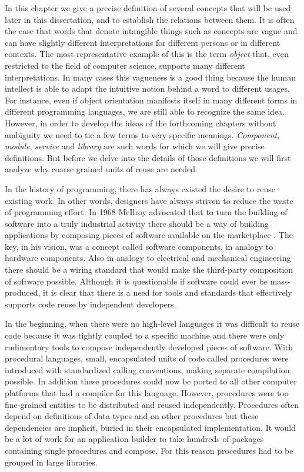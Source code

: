 In this chapter we give a precise definition of several concepts that will be used later in this dissertation, and to
establish the relations between them. It is often the case that words that denote intangible things such as concepts are vague
and can have slightly different interpretations for different persons or in different contexts. The most representative example
of this is the term \emph{object} that, even restricted to the field of computer science, supports many different interpretations.
In many cases this vagueness is a good thing because the human intellect is able to adapt the intuitive notion behind a word
to different usages. For instance, even if object orientation manifests itself in many different forms in different programming
languages, we are still able to recognize the same idea. However, in order to develop the ideas of the forthcoming chapters
without ambiguity we need to tie a few terms to very specific meanings. \emph{Component}, \emph{module}, \emph{service} and
\emph{library} are such words for which we will give precise definitions. But before we delve into the details of those
definitions we will first analyze why coarse grained units of reuse are needed.

In the history of programming, there has always existed the desire to reuse existing work. In other words, designers have always
striven to reduce the waste of programming effort. In 1968 McIlroy advocated that to turn the building of software into a truly
industrial activity there should be a way of building applications by composing pieces of software available on the marketplace
\cite{McIlroy}. The key, in his vision, was a concept called software components, in analogy to hardware components. Also in
analogy to electrical and mechanical engineering there should be a wiring standard that would make the third-party composition
of software possible. Although it is questionable if software could ever be mass-produced, it is clear that there is a need for
tools and standards that effectively supports code reuse by independent developers.

In the beginning, when there were no high-level languages it was difficult to reuse code because it was tightly coupled to a
specific machine and there were only rudimentary tools to compose independently developed pieces of software.
With procedural languages, small, encapsulated units of code called procedures were introduced with standardized calling
conventions, making separate compilation possible. In addition these procedures could now be ported to all other computer platforms
that had a compiler for this language. However, procedures were too fine-grained entities to be distributed and reused independently.
Procedures often depend on definitions of data types and on other procedures but these dependencies are implicit, buried in their
encapsulated implementation. It would be a lot of work for an application builder to take hundreds of packages containing single procedures and
compose. For this reason procedures had to be grouped in large libraries.

